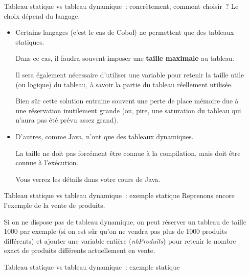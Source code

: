 \begin{frame}{Tableau statique vs tableau dynamique~: concrètement, comment choisir~?}
	Le choix dépend du langage.

	\begin{itemize}
		\item
		Certains langages (c’est le cas de Cobol) ne permettent 
		que des tableaux statiques. 
		
		Dans ce cas, il faudra souvent
		imposer une \textbf{taille maximale} au tableau. 
		
		Il sera également nécessaire d’utiliser une variable 
		pour retenir la taille utile (ou logique) du tableau, 
		à savoir la partie du tableau réellement utilisée.
		
		Bien sûr cette solution entraine souvent une perte de place mémoire due
		à une réservation inutilement grande (ou, pire, une saturation du
		tableau qui n’aura pas été prévu assez grand).
		
		\item	
		D'autres, comme Java, n'ont que des tableaux dynamiques. 
		
		La taille ne doit pas forcément être connue à la compilation, 
		mais doit être connue à	l'exécution. 
		
		Vous verrez les détails dans votre cours de Java.
	\end{itemize}
\end{frame}

\begin{frame}{Tableau statique vs tableau dynamique~: exemple statique}
	Reprenons encore l’exemple de la vente de produits. 
	
	Si on ne dispose pas de tableau dynamique, on peut réserver
	un tableau de taille 1000 par exemple (si on est sûr qu’on ne vendra
	pas plus de 1000 produits différents) et ajouter une variable entière
	(\textit{nbProduits}) pour retenir 
	le nombre exact de produits différents actuellement en vente.
\end{frame}

\begin{frame}{Tableau statique vs tableau dynamique~: exemple statique}
\end{frame}

